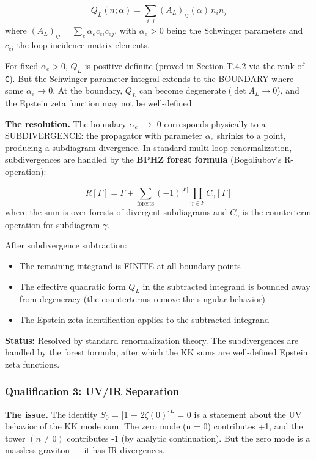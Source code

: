 \documentclass[aps,prd,preprint,superscriptaddress,longbibliography,floatfix]{revtex4-2}
\theoremstyle{remark}
\begin{document}
\begin{equation}
    Q_L(n; \alpha) = \sum_{i,j} (A_L)_{ij}(\alpha)\, n_i n_j
\end{equation}
where $(A_L)_{ij} = \sum_e \alpha_e c_{ei} c_{ej}$, with $\alpha_e > 0$ being the Schwinger parameters and $c_{ei}$ the loop-incidence matrix elements.

For fixed $\alpha_e > 0$, $Q_L$ is positive-definite (proved in Section T.4.2 via the rank of \texttt{C}). But the Schwinger parameter integral extends to the BOUNDARY where some $\alpha_e \to 0$. At the boundary, $Q_L$ can become degenerate ($\det A_L \to 0$), and the Epstein zeta function may not be well-defined.

\textbf{The resolution.} The boundary $\alpha_e$ $\to$ 0 corresponds physically to a SUBDIVERGENCE: the propagator with parameter $\alpha_e$ shrinks to a point, producing a subdiagram divergence. In standard multi-loop renormalization, subdivergences are handled by the \textbf{BPHZ forest formula} (Bogoliubov's R-operation):


\begin{equation}
    R[\Gamma] = \Gamma + \sum_{\text{forests}} (-1)^{|F|} \prod_{\gamma \in F} C_\gamma[\Gamma]
\end{equation}
where the sum is over forests of divergent subdiagrams and $C_\gamma$ is the counterterm operation for subdiagram $\gamma$.

After subdivergence subtraction:

\begin{itemize}
  \item The remaining integrand is FINITE at all boundary points
  \item The effective quadratic form $Q_L$ in the subtracted integrand is bounded away from degeneracy (the counterterms remove the singular behavior)
  \item The Epstein zeta identification applies to the subtracted integrand
\end{itemize}

\textbf{Status:} Resolved by standard renormalization theory. The subdivergences are handled by the forest formula, after which the KK sums are well-defined Epstein zeta functions.


\subsubsection{Qualification 3: UV/IR Separation}

\textbf{The issue.} The identity $S_{0}$ = [1 + $2\zeta(0)]^L$ = 0 is a statement about the UV behavior of the KK mode sum. The zero mode (n = 0) contributes +1, and the tower $(n \neq 0)$ contributes -1 (by analytic continuation). But the zero mode is a massless graviton --- it has IR divergences.
\end{document}
